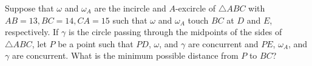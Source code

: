 Suppose that $\omega$ and $\omega_A$ are the incircle and $A$-excircle of $\triangle{ABC}$ with $AB=13,BC=14,CA=15$ such that $\omega$ and $\omega_A$ touch $BC$ at $D$ and $E$, respectively. If $\gamma$ is the circle passing through the midpoints of the sides of $\triangle{ABC}$, let $P$ be a point such that $PD$, $\omega$, and $\gamma$ are concurrent and $PE$, $\omega_A$, and $\gamma$ are concurrent. What is the minimum possible distance from $P$ to $BC$?